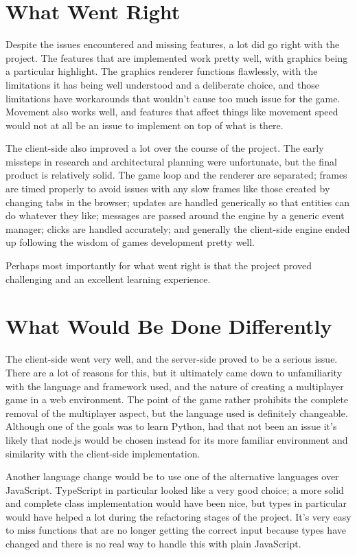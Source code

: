 \section{What Went Right}
Despite the issues encountered and missing features, a lot did go right with the project. The features that are implemented work pretty well, with graphics being a particular highlight. The graphics renderer functions flawlessly, with the limitations it has being well understood and a deliberate choice, and those limitations have workarounds that wouldn't cause too much issue for the game. Movement also works well, and features that affect things like movement speed would not at all be an issue to implement on top of what is there.

The client-side also improved a lot over the course of the project. The early missteps in research and architectural planning were unfortunate, but the final product is relatively solid. The game loop and the renderer are separated; frames are timed properly to avoid issues with any slow frames like those created by changing tabs in the browser; updates are handled generically so that entities can do whatever they like; messages are passed around the engine by a generic event manager; clicks are handled accurately; and generally the client-side engine ended up following the wisdom of games development pretty well.

Perhaps most importantly for what went right is that the project proved challenging and an excellent learning experience.

\section{What Would Be Done Differently}
The client-side went very well, and the server-side proved to be a serious issue. There are a lot of reasons for this, but it ultimately came down to unfamiliarity with the language and framework used, and the nature of creating a multiplayer game in a web environment. The point of the game rather prohibits the complete removal of the multiplayer aspect, but the language used is definitely changeable. Although one of the goals was to learn Python, had that not been an issue it's likely that node.js would be chosen instead for its more familiar environment and similarity with the client-side implementation.

Another language change would be to use one of the alternative languages over JavaScript. TypeScript in particular looked like a very good choice; a more solid and complete class implementation would have been nice, but types in particular would have helped a lot during the refactoring stages of the project. It's very easy to miss functions that are no longer getting the correct input because types have changed and there is no real way to handle this with plain JavaScript.

